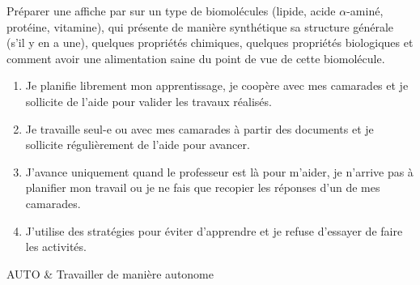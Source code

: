 \begin{programmeSeance}
\end{programmeSeance}
\vspace*{1.2 cm}

\begin{programmeSeance}[2]
\end{programmeSeance}


\begin{tacheFinale}
  Préparer une affiche par  sur un type de biomolécules (lipide, acide $\alpha$-aminé, protéine, vitamine), qui présente de manière synthétique sa structure générale (s'il y en a une), quelques propriétés chimiques, quelques propriétés biologiques et comment avoir une alimentation saine du point de vue de cette biomolécule.
\end{tacheFinale}




\begin{enumerate}[label = \Alph*]
  \item Je planifie librement mon apprentissage, je coopère avec mes camarades et je sollicite de l'aide pour valider les travaux réalisés.
  \item Je travaille seul-e ou avec mes camarades à partir des documents et je sollicite régulièrement de l'aide pour avancer.
  \item J'avance uniquement quand le professeur est là pour m'aider, je n'arrive pas à planifier mon travail ou je ne fais que recopier les réponses d'un de mes camarades.
  \item J'utilise des stratégies pour éviter d'apprendre et je refuse d'essayer de faire les activités.
\end{enumerate}

\begin{tableauCompetences}
  AUTO & Travailler de manière autonome \\
\end{tableauCompetences}